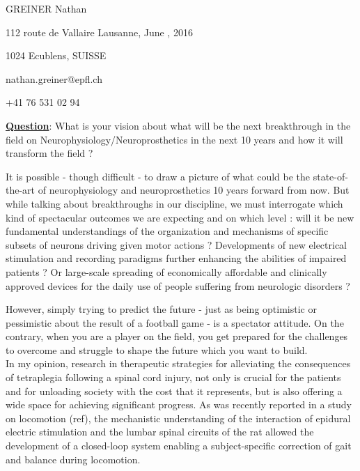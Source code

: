 \documentclass[a4paper,oneside,12pt]{article}
\begin{document}
\thispagestyle{empty}




\begin{flushleft}
GREINER Nathan

112 route de Vallaire \hspace{6.5cm} Lausanne, June , 2016

1024 Ecublens, SUISSE

nathan.greiner@epfl.ch

+41 76 531 02 94
\end{flushleft}

\vspace{1.5cm}

\begin{flushright}
\textbf{\uline{Question}}:  What is your vision about what will be the next breakthrough in the field on Neurophysiology/Neuroprosthetics in the next 10 years and how it will transform the field ?
\end{flushright}

\vspace{0.8cm}

It is possible - though difficult - to draw a picture of what could be the state-of-the-art of neurophysiology and neuroprosthetics 10 years forward from now. But while talking about breakthroughs in our discipline, we must interrogate which kind of spectacular outcomes we are expecting and on which level : will it be new fundamental understandings of the organization and mechanisms of specific subsets of neurons driving given motor actions ? Developments of new electrical stimulation and recording paradigms further enhancing the abilities of impaired patients ? Or large-scale spreading of economically affordable and clinically approved devices for the daily use of people suffering from neurologic disorders ?

However, simply trying to predict the future - just as being optimistic or pessimistic about the result of a football game - is a spectator attitude. On the contrary, when you are a player on the field, you get prepared for the challenges to overcome and struggle to shape the future which you want to build. \\

In my opinion, research in therapeutic strategies for alleviating the consequences of tetraplegia following a spinal cord injury, not only is crucial for the patients and for unloading society with the cost that it represents, but is also offering a wide space for achieving significant progress. 
As was recently reported in a study on locomotion (ref), the mechanistic understanding of the interaction of epidural electric stimulation and the lumbar spinal circuits of the rat allowed the development of a closed-loop system enabling a subject-specific correction of gait and balance during locomotion.
\end{document}
